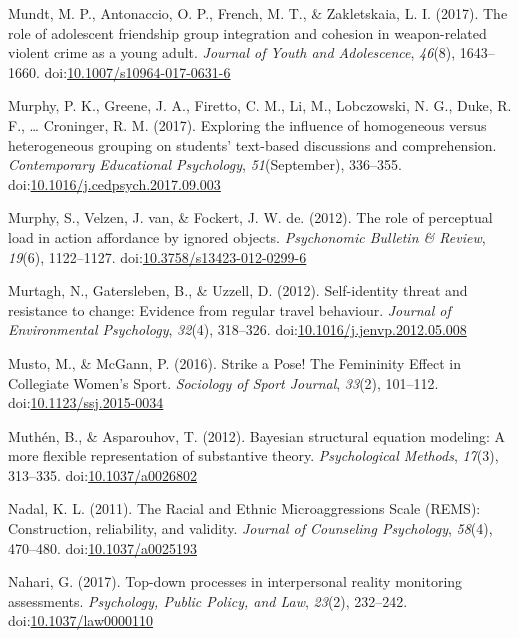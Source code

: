 \documentclass[english,man]{apa6}
\begin{document}
\hypertarget{ref-Mundt2017}{}
Mundt, M. P., Antonaccio, O. P., French, M. T., \& Zakletskaia, L. I.
(2017). The role of adolescent friendship group integration and cohesion
in weapon-related violent crime as a young adult. \emph{Journal of Youth
and Adolescence}, \emph{46}(8), 1643--1660.
doi:\href{https://doi.org/10.1007/s10964-017-0631-6}{10.1007/s10964-017-0631-6}

\hypertarget{ref-Murphy2017}{}
Murphy, P. K., Greene, J. A., Firetto, C. M., Li, M., Lobczowski, N. G.,
Duke, R. F., \ldots{} Croninger, R. M. (2017). Exploring the influence
of homogeneous versus heterogeneous grouping on students' text-based
discussions and comprehension. \emph{Contemporary Educational
Psychology}, \emph{51}(September), 336--355.
doi:\href{https://doi.org/10.1016/j.cedpsych.2017.09.003}{10.1016/j.cedpsych.2017.09.003}

\hypertarget{ref-Murphy2012}{}
Murphy, S., Velzen, J. van, \& Fockert, J. W. de. (2012). The role of
perceptual load in action affordance by ignored objects.
\emph{Psychonomic Bulletin \& Review}, \emph{19}(6), 1122--1127.
doi:\href{https://doi.org/10.3758/s13423-012-0299-6}{10.3758/s13423-012-0299-6}

\hypertarget{ref-Murtagh2012}{}
Murtagh, N., Gatersleben, B., \& Uzzell, D. (2012). Self-identity threat
and resistance to change: Evidence from regular travel behaviour.
\emph{Journal of Environmental Psychology}, \emph{32}(4), 318--326.
doi:\href{https://doi.org/10.1016/j.jenvp.2012.05.008}{10.1016/j.jenvp.2012.05.008}

\hypertarget{ref-Musto2016}{}
Musto, M., \& McGann, P. (2016). Strike a Pose! The Femininity Effect in
Collegiate Women's Sport. \emph{Sociology of Sport Journal},
\emph{33}(2), 101--112.
doi:\href{https://doi.org/10.1123/ssj.2015-0034}{10.1123/ssj.2015-0034}

\hypertarget{ref-Muthen2012}{}
Muthén, B., \& Asparouhov, T. (2012). Bayesian structural equation
modeling: A more flexible representation of substantive theory.
\emph{Psychological Methods}, \emph{17}(3), 313--335.
doi:\href{https://doi.org/10.1037/a0026802}{10.1037/a0026802}

\hypertarget{ref-Nadal2011}{}
Nadal, K. L. (2011). The Racial and Ethnic Microaggressions Scale
(REMS): Construction, reliability, and validity. \emph{Journal of
Counseling Psychology}, \emph{58}(4), 470--480.
doi:\href{https://doi.org/10.1037/a0025193}{10.1037/a0025193}

\hypertarget{ref-Nahari2017}{}
Nahari, G. (2017). Top-down processes in interpersonal reality
monitoring assessments. \emph{Psychology, Public Policy, and Law},
\emph{23}(2), 232--242.
doi:\href{https://doi.org/10.1037/law0000110}{10.1037/law0000110}
\end{document}
